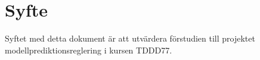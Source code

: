 \section{Syfte}
Syftet med detta dokument är att utvärdera förstudien till projektet modellprediktionsreglering i kursen TDDD77.
